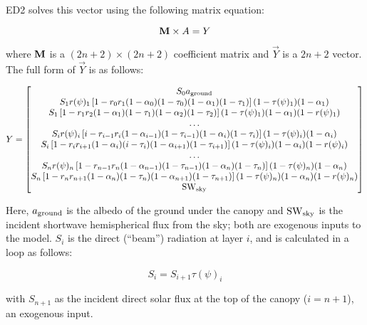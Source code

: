 ED2 solves this vector using the following matrix equation:

\begin{equation}
  \mathbf{M} \times \relax{A} = \relax{Y}
\end{equation}

where $\mathbf{M}$ is a $(2n + 2) \times (2n + 2)$ coefficient matrix and $\vec{Y}$ is a $2n + 2$ vector.
The full form of $\vec{Y}$ is as follows:

\begin{equation}
  \relax{Y} =
  \begin{bmatrix}
    S_0 a_{\mathrm{ground}} \\
    S_1 r(\psi)_1 \left[ 1 - r_0 r_1 (1 - \alpha_0) (1 - \tau_0) (1 - \alpha_1) (1 - \tau_1) \right] (1 - \tau(\psi)_1) (1 - \alpha_1) \\
    S_1 \left[ 1 - r_1 r_2 (1 - \alpha_1) (1 - \tau_1) (1 - \alpha_2) (1 - \tau_2) \right] (1 - \tau(\psi)_1) (1 - \alpha_1) (1 - r(\psi)_1) \\
    \ldots \\
    S_i r(\psi)_i \left[ i - r_{i-1} r_i (1 - \alpha_{i-1}) (1 - \tau_{i-1}) (1 - \alpha_i) (1 - \tau_i) \right] (1 - \tau(\psi)_i) (1 - \alpha_i) \\
    S_i \left[ 1 - r_i r_{i+1} (1 - \alpha_i) (i - \tau_i) (1 - \alpha_{i+1}) (1 - \tau_{i+1}) \right] (1 - \tau(\psi)_i) (1 - \alpha_i) (1 - r(\psi)_i) \\
    \ldots \\
    S_n r(\psi)_n \left[ 1 - r_{n-1} r_n (1 - \alpha_{n-1}) (1 - \tau_{n-1}) (1 - \alpha_n) (1 - \tau_n) \right] (1 - \tau(\psi)_n) (1 - \alpha_n) \\
    S_n \left[ 1 - r_n r_{n+1} (1 - \alpha_n) (1 - \tau_n) (1 - \alpha_{n+1}) (1 - \tau_{n+1}) \right] (1 - \tau(\psi)_n) (1 - \alpha_n) (1 - r(\psi)_n) \\
    \mathrm{SW}_{\mathrm{sky}}
  \end{bmatrix}
\end{equation}

Here, $a_{\mathrm{ground}}$ is the albedo of the ground under the canopy and $\mathrm{SW}_{\mathrm{sky}}$ is the incident shortwave hemispherical flux from the sky;
both are exogenous inputs to the model.
$S_i$ is the direct (``beam'') radiation at layer $i$, and is calculated in a loop as follows:

\begin{equation}
  S_i = S_{i + 1} \tau(\psi)_i
\end{equation}

with $S_{n+1}$ as the incident direct solar flux at the top of the canopy ($i = n + 1$), an exogenous input.

